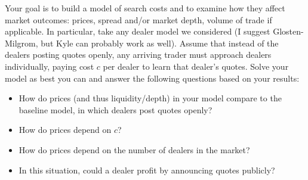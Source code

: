 \documentclass[11pt
, answers
]{exam}
\begin{document}
Your goal is to build a model of search costs and to examine how they affect market outcomes: prices, spread and/or market depth, volume of trade if applicable. In particular, take any dealer model we considered (I suggest Glosten-Milgrom, but Kyle can probably work as well). Assume that instead of the dealers posting quotes openly, any arriving trader must approach dealers individually, paying cost $c$ per dealer to learn that dealer's quotes. Solve your model as best you can and answer the following questions based on your results:
\begin{itemize}
	\item How do prices (and thus liquidity/depth) in your model compare to the baseline model, in which dealers post quotes openly?
	\item How do prices depend on $c$? 
	\item How do prices depend on the number of dealers in the market?
	\item In this situation, could a dealer profit by announcing quotes publicly?
\end{itemize}
\end{document}
